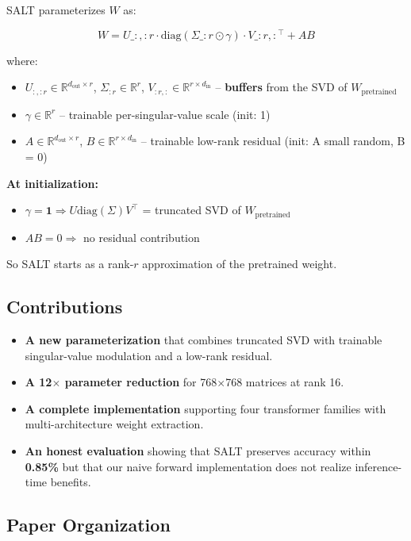 SALT parameterizes $W$ as:

\[
W = U\_{:,:r} \cdot \text{diag}(\Sigma\_{:r} \odot \gamma) \cdot V\_{:r,:}^\top + A B
\tag{1.2}
\]

where:

\begin{itemize}
\item $U_{:,:r} \in \mathbb{R}^{d_\text{out} \times r}$,
  $\Sigma_{:r} \in \mathbb{R}^r$,
  $V_{:r,:} \in \mathbb{R}^{r \times d_\text{in}}$ -- \textbf{buffers} from the SVD of $W_\text{pretrained}$
\item $\gamma \in \mathbb{R}^r$ -- trainable per-singular-value scale (init: 1)
\item $A \in \mathbb{R}^{d_\text{out} \times r}$,
  $B \in \mathbb{R}^{r \times d_\text{in}}$ -- trainable low-rank residual (init: A small random, B = 0)

\end{itemize}
\textbf{At initialization:}
\begin{itemize}
\item $\gamma = \mathbf{1} \Rightarrow U \text{diag}(\Sigma) V^\top$ = truncated SVD of $W_\text{pretrained}$
\item $A B = 0 \Rightarrow$ no residual contribution

\end{itemize}
So SALT starts as a rank-$r$ approximation of the pretrained weight.

\subsection{Contributions}

\begin{itemize}
\item \textbf{A new parameterization} that combines truncated SVD with trainable
  singular-value modulation and a low-rank residual.
\item \textbf{A 12$\times$ parameter reduction} for 768$\times$768 matrices at rank 16.
\item \textbf{A complete implementation} supporting four transformer families with
  multi-architecture weight extraction.
\item \textbf{An honest evaluation} showing that SALT preserves accuracy within
  \textbf{0.85\%} but that our naive forward implementation does not
  realize inference-time benefits.

\end{itemize}
\subsection{Paper Organization}

